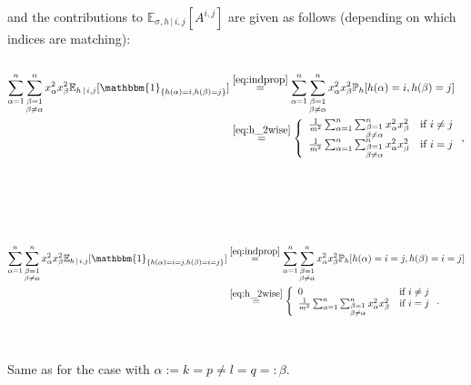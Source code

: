\documentclass[10pt,usenames,dvipsnames]{article}
\newcommand{\Pbb}{\mathbb{P}}
\newcommand{\Ebb}{\mathbb{E}}
\newcommand{\ind}{\mathbbm{1}} %
\newenvironment{exercise}[2][Exercise]{\begin{trivlist}
  \item[\hskip \labelsep {\bfseries #1}\hskip \labelsep {\bfseries #2.}]}{\end{trivlist}}
\begin{document}
\begin{exercise}{2b}
\begin{enumerate}
$$			$$
			and the contributions to $\Ebb_{\sigma, h\, | \, i,j} [A^{i,j}]$ are given as follows (depending on which indices are matching): \\ \\
				\small
					\begin{align}
					\sum_{\alpha=1}^n \sum_{\substack{\beta=1 \\ \beta \neq \alpha}}^n x_\alpha^2 x_\beta^2 \Ebb_{ h\, | \, i,j}[\ind_{\{h(\alpha)=i, h(\beta)=j \}}] 	
							& \overset{\eqref{eq:indprop}}{=} 
							\sum_{\alpha=1}^n \sum_{\substack{\beta=1 \\ \beta \neq \alpha}}^n x_\alpha^2 x_\beta^2  \Pbb_{h}[h(\alpha)=i, h(\beta)=j ]
							\nonumber \\
							& \overset{\eqref{eq:h_2wise}}{=}  \left\{ 
							\begin{array}{ll}
								\frac{1}{m^2}\sum_{\alpha=1}^n \sum_{\substack{\beta=1 \\ \beta \neq \alpha}}^n x_\alpha^2 x_\beta^2  & \mbox{if } i\neq j \\
								\frac{1}{m^2}\sum_{\alpha=1}^n \sum_{\substack{\beta=1 \\ \beta \neq \alpha}}^n x_\alpha^2 x_\beta^2 & \mbox{if } i= j  \label{eq:A2} \\
							\end{array}\right.,
					\end{align}
				\normalsize 
				\\ \\
			 \\ \\
				\small
					\begin{align}
					\sum_{\alpha=1}^n \sum_{\substack{\beta=1 \\ \beta \neq \alpha}}^n x_\alpha^2 x_\beta^2 \Ebb_{ h\, | \, i,j}[\ind_{\{h(\alpha)=i=j, h(\beta)=i=j \}}] 	
							& \overset{\eqref{eq:indprop}}{=} 
							\sum_{\alpha=1}^n \sum_{\substack{\beta=1 \\ \beta \neq \alpha}}^n x_\alpha^2 x_\beta^2  \Pbb_{h}[h(\alpha)=i=j, h(\beta)=i=j ]
							 \nonumber\\
							& \overset{\eqref{eq:h_2wise}}{=} \left\{ 
							\begin{array}{ll}
								0 & \mbox{if } i\neq j \\
								\frac{1}{m^2}\sum_{\alpha=1}^n \sum_{\substack{\beta=1 \\ \beta \neq \alpha}}^n x_\alpha^2 x_\beta^2  & \mbox{if } i= j  \label{eq:A3} \\
							\end{array}\right..
					\end{align}
				\normalsize 			
			 \\ \\Same as for the case with  $\alpha := k=p\neq l = q =: \beta$.
		


\end{enumerate}
\end{exercise}
\end{document}
